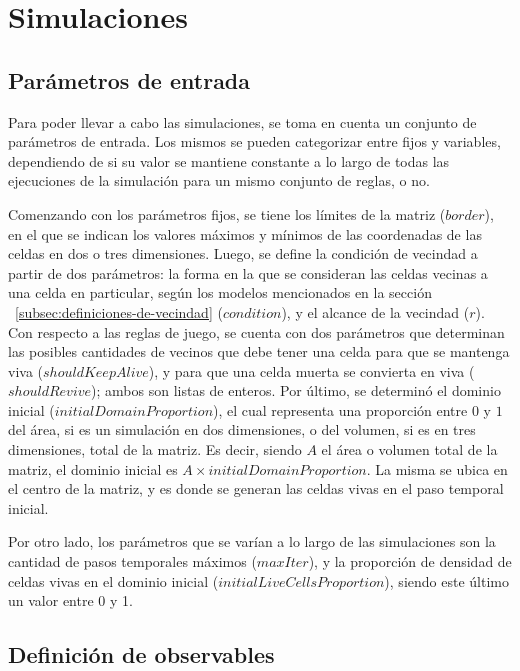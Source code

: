 \section{Simulaciones}\label{sec:simulaciones}

\subsection{Parámetros de entrada}\label{subsec:parametros-de-entrada}

Para poder llevar a cabo las simulaciones, se toma en cuenta un conjunto de parámetros de entrada.
Los mismos se pueden categorizar entre fijos y variables, dependiendo de si su valor se mantiene
constante a lo largo de todas las ejecuciones de la simulación para un mismo conjunto de reglas, o no.

Comenzando con los parámetros fijos, se tiene los límites de la matriz ($border$),
en el que se indican los valores máximos y mínimos de las coordenadas de las celdas en dos o tres dimensiones.
Luego, se define la condición de vecindad a partir de dos parámetros:
la forma en la que se consideran las celdas vecinas a una celda en particular, según los modelos mencionados
en la sección ~\ref{subsec:definiciones-de-vecindad} ($condition$), y el alcance de la vecindad ($r$).
Con respecto a las reglas de juego, se cuenta con dos parámetros que determinan las posibles cantidades de
vecinos que debe tener una celda para que se mantenga viva ($shouldKeepAlive$),
y para que una celda muerta se convierta en viva ($shouldRevive$); ambos son listas de enteros.
Por último, se determinó el dominio inicial ($initialDomainProportion$), el
cual representa una proporción entre $0$ y $1$ del área, si es un simulación en dos dimensiones, o del volumen,
si es en tres dimensiones, total de la matriz. 
Es decir, siendo $A$ el área o volumen total de la matriz, el dominio inicial es $A \times initialDomainProportion$.
La misma se ubica en el centro de la matriz, y es donde se generan las celdas vivas en el paso temporal inicial.

Por otro lado, los parámetros que se varían a lo largo de las simulaciones son la cantidad de pasos temporales
máximos ($maxIter$), y la proporción de densidad de celdas vivas en el dominio inicial ($initialLiveCellsProportion$),
siendo este último un valor entre 0 y 1.


\subsection{Definición de observables}\label{subsec:observables-posibles}

